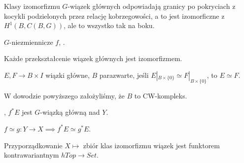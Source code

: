  \begin{stwierdzenie}
  Klasy izomorfizmu $G$-wiązek głównych odpowiadają granicy po pokryciach z kocykli podzielonych przez relację kobrzegowości, a to jest izomorficzne z $H^1(B, C(B,G))$, ale to wszystko tak na boku.
 \end{stwierdzenie}
 
 \begin{definicja} $G$-niezmiennicze $f$, .

 \end{definicja}

 
 \begin{stwierdzenie}
  Każde przekształcenie wiązek głównych jest izomorfizmem.
 \end{stwierdzenie}
 
 \begin{lemat}
  $E, F \to B \times I$ wiązki główne, $B$ parazwarte, jeśli $E|_{B \times \{0\}} \simeq F|_{B \times \{0\}}$, to $E \simeq F$.
 \end{lemat}
 
 W dowodzie powyższego założyliśmy, że $B$ to CW-kompleks.
 
 \begin{wniosek}
  , $f^\ast E$ jest $G$-wiązką główną nad $Y$.
 \end{wniosek}
 
 \begin{twierdzenie}
  $f \simeq g:Y \to X \implies f^\ast E \simeq g^\ast E$.
 \end{twierdzenie}
 
 \begin{wniosek}
  Przyporządkowanie $X \mapsto$ zbiór klas izomorfizmu wiązek jest funktorem kontrawariantnym $hTop \to Set$.
 \end{wniosek}
 
